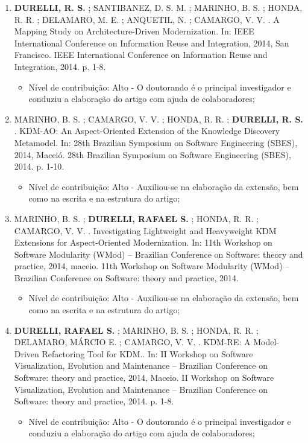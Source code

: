 \begin{itemize}
\begin{enumerate}
		\item \textbf{DURELLI, R. S.} ; SANTIBANEZ, D. S. M. ; MARINHO, B. S. ; HONDA, R. R. ; DELAMARO, M. E. ; ANQUETIL, N. ; CAMARGO, V. V. . A Mapping Study on Architecture-Driven Modernization. In: IEEE International Conference on Information Reuse and Integration, 2014, San Francisco. IEEE International Conference on Information Reuse and Integration, 2014. p. 1-8.
		    \begin{itemize}
			        \item Nível de contribuição: Alto - O doutorando é o principal investigador e conduziu a elaboração do artigo com ajuda de colaboradores;
			    \end{itemize}
		
		\item MARINHO, B. S. ; CAMARGO, V. V. ; HONDA, R. R. ; \textbf{DURELLI, R. S.} . KDM-AO: An Aspect-Oriented Extension of the Knowledge Discovery Metamodel. In: 28th Brazilian Symposium on Software Engineering (SBES), 2014, Maceió. 28th Brazilian Symposium on Software Engineering (SBES), 2014. p. 1-10.
		
		    \begin{itemize}
			        \item Nível de contribuição: Alto - Auxiliou-se na elaboração da extensão, bem como na escrita e na estrutura do artigo;
			    \end{itemize}
		
		\item MARINHO, B. S. ; \textbf{DURELLI, RAFAEL S.} ; HONDA, R. R. ; CAMARGO, V. V. . Investigating Lightweight and Heavyweight KDM Extensions for Aspect-Oriented Modernization. In: 11th Workshop on Software Modularity (WMod) -- Brazilian Conference on Software: theory and practice, 2014, maceio. 11th Workshop on Software Modularity (WMod) -- Brazilian Conference on Software: theory and practice, 2014.
		
		\begin{itemize}
			        \item Nível de contribuição: Alto - Auxiliou-se na elaboração da extensão, bem como na escrita e na estrutura do artigo;
			    \end{itemize}
		
		\item \textbf{DURELLI, RAFAEL S.} ; MARINHO, B. S. ; HONDA, R. R. ; DELAMARO, MÁRCIO E. ; CAMARGO, V. V. . KDM-RE: A Model-Driven Refactoring Tool for KDM.. In: II Workshop on Software Visualization, Evolution and Maintenance -- Brazilian Conference on Software: theory and practice, 2014, Maceio. II Workshop on Software Visualization, Evolution and Maintenance -- Brazilian Conference on Software: theory and practice, 2014. p. 1-8.
		
		    \begin{itemize}
			        \item Nível de contribuição: Alto - O doutorando é o principal investigador e conduziu a elaboração do artigo com ajuda de colaboradores;
			    \end{itemize}
	

\end{enumerate}
\end{itemize}